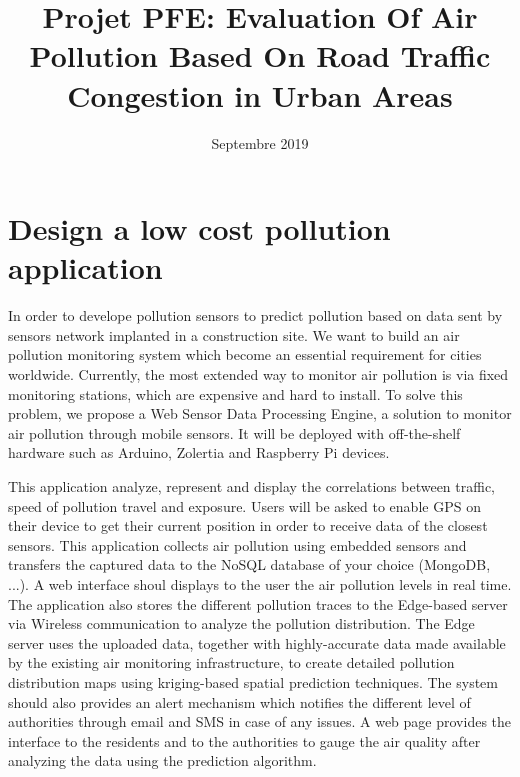 \documentclass[a4paper]{article}
\title{\textbf{Projet PFE:} Evaluation Of Air Pollution Based On  Road Traffic Congestion in Urban Areas}
\date{Septembre 2019}
\begin{document}
\maketitle



\section{Design a low cost pollution application}

In order to develope pollution sensors to predict pollution based on data sent by sensors network implanted in a construction site\cite{alvear_architecture_2016,rosmiati_air_2019}.
We want to build an air pollution monitoring system which become an essential requirement for cities worldwide.
Currently,
	the most extended way to monitor air pollution is via fixed monitoring stations\cite{paredes-parra_alternative_2019},
	which are expensive and hard to install.
To solve this problem,
	we propose a Web Sensor Data Processing Engine,
	a solution to monitor air pollution through mobile sensors.
It will be deployed with off-the-shelf hardware such as Arduino, Zolertia and Raspberry Pi devices.

This application analyze,
	represent and display the correlations between traffic,
	speed of pollution travel and exposure.
Users will be asked to enable GPS on their device to get their current position in order to receive data of the closest sensors.
This application collects air pollution using embedded sensors and transfers the captured data to the NoSQL database of your choice (MongoDB, ...).
A web interface shoul displays to the user the air pollution levels in real time.
The application also stores the different pollution traces to the Edge-based server via Wireless communication to analyze the pollution distribution.
The Edge server uses the uploaded data,
	together with highly-accurate data made available by the existing air monitoring infrastructure,
	to create detailed pollution distribution maps using kriging-based spatial prediction techniques.
The system should also provides an alert mechanism which notifies the different level of authorities through email and SMS in case of any issues.
A web page provides the interface to the residents and to the authorities to gauge the air quality after analyzing the data using the prediction algorithm.
\end{document}
